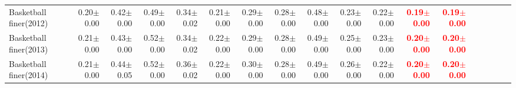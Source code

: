 \documentclass[nohyperref]{article}
\theoremstyle{plain}
\theoremstyle{definition}
\theoremstyle{remark}
\newcommand{\red}[1]{\textcolor{red}{\textbf{#1}}}
\begin{document}
\begin{table*}[!ht]
{\begin{tabular}{lrrrrrrrrrrrrrrrrr}
			Basketball finer(2012) & 0.20$\pm$0.00 & 0.42$\pm$0.00 & 0.49$\pm$0.00 & 0.34$\pm$0.02 & 0.21$\pm$0.00 & 0.29$\pm$0.00 & 0.28$\pm$0.00 & 0.48$\pm$0.00 & 0.23$\pm$0.00 & 0.22$\pm$0.00 & \red{0.19$\pm$0.00} & \red{0.19$\pm$0.00} \\
			Basketball finer(2013) & 0.21$\pm$0.00 & 0.43$\pm$0.00 & 0.52$\pm$0.00 & 0.34$\pm$0.02 & 0.22$\pm$0.00 & 0.29$\pm$0.00 & 0.28$\pm$0.00 & 0.49$\pm$0.00 & 0.25$\pm$0.00 & 0.23$\pm$0.00 & \red{0.20$\pm$0.00} & \red{0.20$\pm$0.00} \\
			Basketball finer(2014) & 0.21$\pm$0.00 & 0.44$\pm$0.05 & 0.52$\pm$0.00 & 0.36$\pm$0.02 & 0.22$\pm$0.00 & 0.30$\pm$0.00 & 0.28$\pm$0.00 & 0.49$\pm$0.00 & 0.26$\pm$0.00 & 0.22$\pm$0.00 & \red{0.20$\pm$0.00} & \red{0.20$\pm$0.00} \\
\bottomrule
\end{tabular}}
\end{table*}
\end{document}
